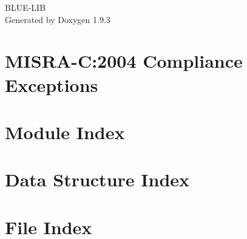 \documentclass[twoside]{book}
\newcommand{\+}{\discretionary{\mbox{\scriptsize$\hookleftarrow$}}{}{}}
\newcommand{\clearemptydoublepage}{%
    \newpage{\pagestyle{empty}\cleardoublepage}%
  }
\begin{document}
  \raggedbottom
    \hypersetup{pageanchor=false,
                bookmarksnumbered=true,
                pdfencoding=unicode
               }
  \begin{titlepage}
  \vspace*{7cm}
  \begin{center}%
  {\Large BLUE-\/\+LIB}\\
  \vspace*{1cm}
  {\large Generated by Doxygen 1.9.3}\\
  \end{center}
  \end{titlepage}
  \clearemptydoublepage
  \tableofcontents
  \clearemptydoublepage
  \hypersetup{pageanchor=true}
\chapter{MISRA-\/C\+:2004 Compliance Exceptions}
\label{CMSIS_MISRA_Exceptions}

\chapter{Module Index}

\chapter{Data Structure Index}

\chapter{File Index}

\end{document}
